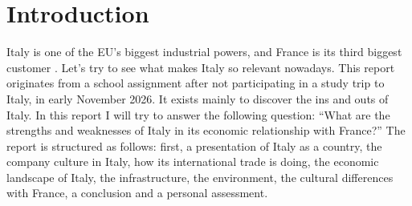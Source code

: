 \section{Introduction}
Italy is one of the EU's biggest industrial powers, and France is its third biggest customer \parencite{france-third-client}. Let's try to see what makes Italy so relevant nowadays.
This report originates from a school assignment after not participating in a study trip to Italy, in early November 2026. It exists mainly to discover the ins and outs of Italy.
In this report I will try to answer the following question: \enquote{What are the strengths and weaknesses of Italy in its economic relationship with France?}
The report is structured as follows: first, a presentation of Italy as a country, the company culture in Italy, how its international trade is doing, the economic landscape of Italy, the infrastructure, the environment, the cultural differences with France, a conclusion and a personal assessment.
